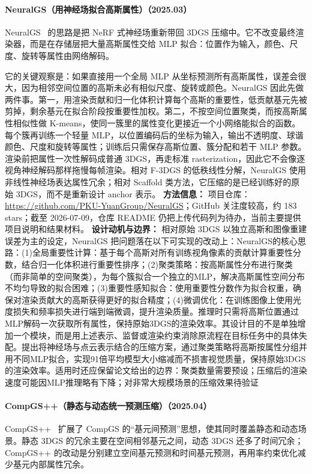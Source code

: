 \paragraph{NeuralGS（用神经场拟合高斯属性）（2025.03）}
NeuralGS~\cite{2503_23162} 的思路是把 NeRF 式神经场重新带回 3DGS 压缩中。它不改变最终渲染器，而是在存储层把大量高斯属性交给 MLP 拟合：位置作为输入，颜色、尺度、旋转等属性由网络解码。

它的关键观察是：如果直接用一个全局 MLP 从坐标预测所有高斯属性，误差会很大，因为相邻空间位置的高斯未必有相似尺度、旋转或颜色。NeuralGS 因此先做两件事。第一，用渲染贡献和归一化体积计算每个高斯的重要性，低贡献基元先被剪掉，剩余基元在拟合阶段按重要性加权。第二，不按空间位置聚类，而按高斯属性相似性做 K-means，使同一簇里的属性变化更接近一个小网络能拟合的函数。每个簇再训练一个轻量 MLP，以位置编码后的坐标为输入，输出不透明度、球谐颜色、尺度和旋转等属性；训练后只需保存高斯位置、簇分配和若干 MLP 参数。渲染前把属性一次性解码成普通 3DGS，再走标准 rasterization，因此它不会像逐视角神经解码那样拖慢每帧渲染。相对 F-3DGS 的低秩线性分解，NeuralGS 使用非线性神经场表达属性冗余；相对 Scaffold 类方法，它压缩的是已经训练好的原始 3DGS，而不是重新设计 anchor 表示。
\textbf{方法信息：} 项目仓库：\url{https://github.com/PKU-YuanGroup/NeuralGS}；GitHub 关注度较高，约 183 stars；截至 2026-07-09，仓库 README 仍把上传代码列为待办，当前主要提供项目说明和结果材料。
\textbf{设计动机与边界：} 相对原始 3DGS 以独立高斯和图像重建误差为主的设定，NeuralGS 把问题落在以下可实现的改动上：NeuralGS的核心思路：(1)全局重要性计算：基于每个高斯对所有训练视角像素的贡献计算重要性分数，结合归一化体积进行重要性排序；(2)聚类策略：按高斯属性分布进行聚类（而非简单的空间聚类），为每个簇拟合一个独立的MLP，解决高斯属性空间分布不均匀导致的拟合困难；(3)重要性感知拟合：使用重要性分数作为拟合权重，确保对渲染贡献大的高斯获得更好的拟合精度；(4)微调优化：在训练图像上使用光度损失和频率损失进行端到端微调，提升渲染质量。推理时只需将高斯位置通过MLP解码一次获取所有属性，保持原始3DGS的渲染效率。其设计目的不是单独增加一个模块，而是用上述表示、监督或渲染约束消除原流程在目标任务中的具体失配。提出将神经场与点云表示结合的压缩方案，通过聚类策略将高斯按属性分组并用不同MLP拟合，实现91倍平均模型大小缩减而不损害视觉质量，保持原始3DGS的渲染效率。适用时还应保留论文给出的边界：聚类数量需要预设；压缩后的渲染速度可能因MLP推理略有下降；对非常大规模场景的压缩效果待验证
\paragraph{CompGS++（静态与动态统一预测压缩）（2025.04）}
CompGS++~\cite{2504_13022} 扩展了 CompGS 的“基元间预测”思想，使其同时覆盖静态和动态场景。静态 3DGS 的冗余主要在空间相邻基元之间，动态 3DGS 还多了时间冗余；CompGS++ 的改动是分别建立空间基元预测和时间基元预测，再用率约束优化减少基元内部属性冗余。

